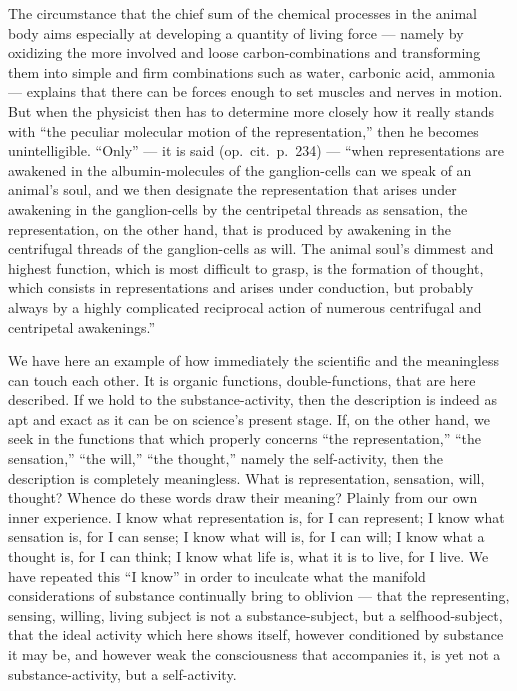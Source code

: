 \documentclass[12pt]{book}
\begin{document}
The circumstance that the chief sum of the chemical processes in the animal body aims
especially at developing a quantity of living force --- namely by oxidizing the more involved
and loose carbon-combinations and transforming them into simple and firm combinations such as
water, carbonic acid, ammonia --- explains that there can be forces enough to set muscles and
nerves in motion. But when the physicist then has to determine more closely how it really
stands with ``the peculiar molecular motion of the representation,'' then he becomes
unintelligible. ``Only'' --- it is said (op.\ cit.\ p.\ 234) --- ``when representations are
awakened in the albumin-molecules of the ganglion-cells can we speak of an animal's soul, and
we then designate the representation that arises under awakening in the ganglion-cells by the
centripetal threads as sensation, the representation, on the other hand, that is produced by
awakening in the centrifugal threads of the ganglion-cells as will. The animal soul's dimmest
and highest function, which is most difficult to grasp, is the formation of thought, which
consists in representations and arises under conduction, but probably always by a highly
complicated reciprocal action of numerous centrifugal and centripetal awakenings.''

We have here an example of how immediately the scientific and the meaningless can touch each
other. It is organic functions, double-functions, that are here described. If we hold to the
substance-activity, then the description is indeed as apt and exact as it can be on science's
present stage. If, on the other hand, we seek in the functions that which properly concerns
``the representation,'' ``the sensation,'' ``the will,'' ``the thought,'' namely the
self-activity, then the description is completely meaningless. What is representation,
sensation, will, thought? Whence do these words draw their meaning? Plainly from our own inner
experience. I know what representation is, for I can represent; I know what sensation is, for I
can sense; I know what will is, for I can will; I know what a thought is, for I can think; I
know what life is, what it is to live, for I live. We have repeated this ``I know'' in order to
inculcate what the manifold considerations of substance continually bring to oblivion --- that
the representing, sensing, willing, living subject is not a substance-subject, but a
selfhood-subject, that the ideal activity which here shows itself, however conditioned by
substance it may be, and however weak the consciousness that accompanies it, is yet not a
substance-activity, but a self-activity.
\end{document}
